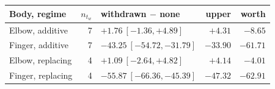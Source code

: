 \begin{tabular}{@{}lrlrr@{}}
\toprule
Body, regime & $n_{t_w}$ & withdrawn $-$ none & upper & worth\\
\midrule
Elbow, additive & 7 & $+1.76\ [-1.36, +4.89]$ & $+4.31$ & $-8.65$ \\
Finger, additive & 7 & $\mathbf{-43.25}\ [-54.72, -31.79]$ & $-33.90$ & $-61.71$ \\
Elbow, replacing & 4 & $+1.09\ [-2.64, +4.82]$ & $+4.14$ & $-4.01$ \\
Finger, replacing & 4 & $\mathbf{-55.87}\ [-66.36, -45.39]$ & $-47.32$ & $-62.91$ \\
\bottomrule
\end{tabular}
